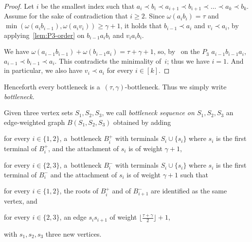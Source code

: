 \documentclass[a4paper,UKenglish,cleveref,hyperref,autoref]{lipics-v2021}
\newcommand{\weight}{\omega}
\begin{document}
\begin{proof}
  Let $i$ be the smallest index such that $a_i \prec b_i \prec a_{i+1} \prec b_{i+1} \prec \dots \prec a_k \prec b_k$.
  Assume for the sake of contradiction that $i \geqslant 2$.
  Since $\weight(a_ib_i) = \tau$ and  $\min(\weight(a_ib_{i-1}), \weight(a_iv_i)) \geqslant \gamma+1$, it holds that $b_{i-1} \prec a_i$ and $v_i \prec a_i$, by applying~\cref{lem:P3-order} on $b_{i-1} a_i b_i$ and $v_i a_i b_i$.

We have $\weight(a_{i-1}b_{i-1}) + \weight(b_{i-1}a_i) = \tau + \gamma + 1$, so, by~ on the $P_3$ $a_{i-1}b_{i-1}a_i$, $a_{i-1} \prec b_{i-1} \prec a_i$.
This contradicts the minimality of~$i$; thus we have $i = 1$.
And in particular, we also have $v_i \prec a_i$ for every $i \in [k]$.
\end{proof}

Henceforth every bottleneck is a~$(\tau, \gamma)$-bottleneck.
Thus we simply write \emph{bottleneck}.

\begin{definition}\label{def:bottleneck-seq}
  Given three vertex sets $S_1, S_2, S_3$, we call \emph{bottleneck sequence on $S_1, S_2, S_3$} an edge-weighted graph $B(S_1, S_2, S_3)$ obtained by adding
  \begin{compactenum}
  \item for every $i \in \{1,2\}$, a~bottleneck $B_i^+$ with terminals $S_i \cup \{s_i\}$ where $s_i$ is the first terminal of $B_i^+$, and the attachment of $s_i$ is of weight $\gamma + 1$, 
  \item for every $i \in \{2,3\}$, a~bottleneck $B_i^-$ with terminals $S_i \cup \{s_i\}$ where $s_i$ is the first terminal of $B_i^-$ and the attachment of $s_i$ is of weight $\gamma + 1$ such that
  \item for every $i \in \{1,2\}$, the roots of $B_i^+$ and of $B_{i+1}^-$ are identified as the same vertex, and
  \item for every $i \in \{2,3\}$, an edge $s_is_{i+1}$ of weight $\lfloor \frac{\tau + \gamma}{2} \rfloor + 1$, 
  \end{compactenum}
  with $s_1, s_2, s_3$ three new vertices.
\end{definition}
\end{document}
